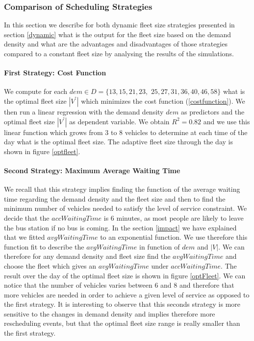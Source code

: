 \documentclass[12pt,a4paper]{article}
\begin{document}
\subsubsection{Comparison of Scheduling Strategies}
In this section we describe for both dynamic fleet size strategies presented in section \ref{dynamic} what is the output for the fleet size based on the demand density and what are the advantages and disadvantages of those strategies compared to a constant fleet size by analysing the results of the simulations.
\paragraph{First Strategy: Cost Function}
We compute for each $dem \in D =  \{13, 15, 21, 23,$ $25, 27, 31, 36, 40, 46, 58\}$ what is the optimal fleet size $|V^{°}|$ which minimizes the cost function (\ref{costfunction}). We then run a linear regression with the demand density $dem$ as predictors and the optimal fleet size $|V^{°}|$ as dependent variable. We obtain $R^{2} = 0.82$ and we use this linear function which grows from 3 to 8 vehicles to determine at each time of the day what is the optimal fleet size. The adaptive fleet size through the day is shown in figure \ref{optfleet}.
  
\paragraph{Second Strategy: Maximum Average Waiting Time}
We recall that this strategy implies finding the function of the average waiting time regarding the demand density and the fleet size and then to find the minimum number of vehicles needed to satisfy the level of service constraint. We decide that the $accWaitingTime$ is 6 minutes, as most people are likely to leave the bus station if no bus is coming. In the section \ref{impact} we have explained that we fitted $avgWaitingTime$ to an exponential function. We use therefore this function fit to describe the $avgWaitingTime$ in function of $dem$ and $|V|$. We can therefore for any demand density and fleet size find the $avgWaitingTime$ and choose the fleet which gives an $avgWaitingTime$ under $accWaitingTime$. The result over the day of the optimal fleet size is shown in figure \ref{optFleet}. We can notice that the number of vehicles varies between 6 and 8 and therefore that more vehicles are needed in order to achieve a given level of service as opposed to the first strategy. It is interesting to observe that this seconds strategy is more sensitive to the changes in demand density and implies therefore more rescheduling events, but that the optimal fleet size range is really smaller than the first strategy. 
\end{document}
